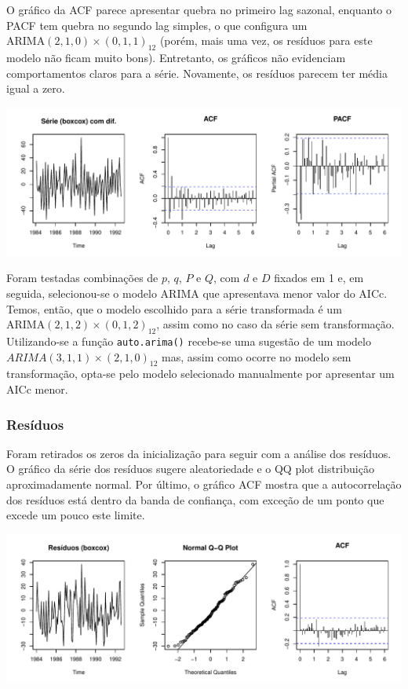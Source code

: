 \documentclass[
  letterpaper,
  DIV=11,
  numbers=noendperiod]{scrartcl}
\begin{document}
O gráfico da ACF parece apresentar quebra no primeiro lag sazonal,
enquanto o PACF tem quebra no segundo lag simples, o que configura um
\(\text{ARIMA}(2,1,0)\times(0,1,1)_{12}\) (porém, mais uma vez, os
resíduos para este modelo não ficam muito bons). Entretanto, os gráficos
não evidenciam comportamentos claros para a série. Novamente, os
resíduos parecem ter média igual a zero.

\includegraphics{T2_grupo5_files/figure-pdf/acf-pacf-arima-boxcox-1.pdf}

Foram testadas combinações de \(p\), \(q\), \(P\) e \(Q\), com \(d\) e
\(D\) fixados em 1 e, em seguida, selecionou-se o modelo ARIMA que
apresentava menor valor do AICc. Temos, então, que o modelo escolhido
para a série transformada é um
\(\text{ARIMA}(2,1,2)\times(0,1,2)_{12}\), assim como no caso da série
sem transformação. Utilizando-se a função \texttt{auto.arima()}
recebe-se uma sugestão de um modelo \(ARIMA(3,1,1)\times(2,1,0)_{12}\)
mas, assim como ocorre no modelo sem transformação, opta-se pelo modelo
selecionado manualmente por apresentar um AICc menor.

\hypertarget{resuxedduos-1}{%
\subsubsection{Resíduos}\label{resuxedduos-1}}

Foram retirados os zeros da inicialização para seguir com a análise dos
resíduos. O gráfico da série dos resíduos sugere aleatoriedade e o QQ
plot distribuição aproximadamente normal. Por último, o gráfico ACF
mostra que a autocorrelação dos resíduos está dentro da banda de
confiança, com exceção de um ponto que excede um pouco este limite.

\includegraphics{T2_grupo5_files/figure-pdf/residuos-arima-boxcox-1.pdf}
\end{document}
